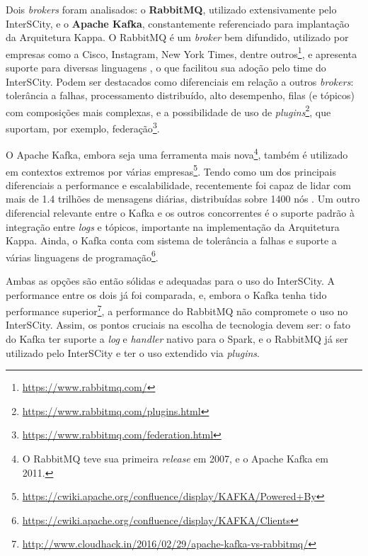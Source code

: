 Dois \textit{brokers} foram analisados: o \textbf{RabbitMQ},  utilizado
extensivamente pelo InterSCity, e o \textbf{Apache Kafka}, constantemente
referenciado para implantação da Arquitetura Kappa. O RabbitMQ é um
\textit{broker} bem difundido, utilizado por empresas como a Cisco, Instagram,
New York Times, dentre outros\footnote{\url{https://www.rabbitmq.com/}},
e apresenta suporte para diversas linguagens \cite{zaitsev2014}, o que
facilitou sua adoção pelo time do InterSCity. Podem ser destacados como
diferenciais em relação a outros \textit{brokers}: tolerância a falhas,
processamento distribuído, alto desempenho, filas (e tópicos) com composições
mais complexas, e a possibilidade de uso de
\textit{plugins}\footnote{\url{https://www.rabbitmq.com/plugins.html}},
que suportam, por exemplo,
federação\footnote{\url{https://www.rabbitmq.com/federation.html}}.

O Apache Kafka, embora seja uma ferramenta mais nova\footnote{O RabbitMQ teve
sua primeira \textit{release} em 2007, e o Apache Kafka em 2011.}, também é
utilizado em contextos extremos por várias
empresas\footnote{\url{https://cwiki.apache.org/confluence/display/KAFKA/Powered+By}}.
Tendo como um dos principais diferenciais a performance e escalabilidade,
recentemente foi capaz de lidar com mais de 1.4 trilhões de mensagens diárias,
distribuídas sobre 1400 nós \cite{koshy2016}. Um outro diferencial relevante
entre o Kafka e os outros concorrentes é o suporte padrão à integração entre
\textit{logs} e tópicos, importante na implementação da Arquitetura Kappa. Ainda,
o Kafka conta com sistema de tolerância a falhas e suporte a várias linguagens de
programação\footnote{\url{https://cwiki.apache.org/confluence/display/KAFKA/Clients}}.

Ambas as opções são então sólidas e adequadas para o uso do InterSCity. A
performance entre os dois já foi comparada, e, embora o Kafka tenha tido
performance
superior\footnote{\url{http://www.cloudhack.in/2016/02/29/apache-kafka-vs-rabbitmq/}},
a performance do RabbitMQ não compromete o uso no InterSCity. Assim, os pontos
cruciais na escolha de tecnologia devem ser: o fato do Kafka ter suporte a
\textit{log} e \textit{handler} nativo para o Spark, e o RabbitMQ já ser
utilizado pelo InterSCity e ter o uso extendido via \textit{plugins}.

